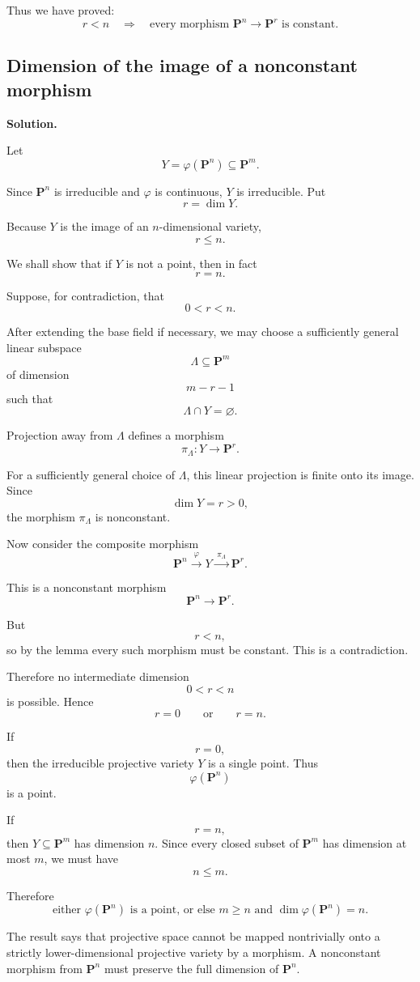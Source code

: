 Thus we have proved:
\[
\boxed{
	r<n
	\quad\Longrightarrow\quad
	\text{every morphism }\mathbf{P}^n\to \mathbf{P}^r\text{ is constant.}
}
\]

\subsection{Dimension of the image of a nonconstant morphism}

\textbf{Solution.}

Let
\[
Y=\varphi(\mathbf{P}^n)\subseteq \mathbf{P}^m.
\]

Since \(\mathbf{P}^n\) is irreducible and \(\varphi\) is continuous, \(Y\) is irreducible. Put
\[
r=\dim Y.
\]

Because \(Y\) is the image of an \(n\)-dimensional variety,
\[
r\leq n.
\]

We shall show that if \(Y\) is not a point, then in fact
\[
r=n.
\]

Suppose, for contradiction, that
\[
0<r<n.
\]

After extending the base field if necessary, we may choose a sufficiently general linear subspace
\[
\Lambda\subseteq \mathbf{P}^m
\]
of dimension
\[
m-r-1
\]
such that
\[
\Lambda\cap Y=\varnothing.
\]

Projection away from \(\Lambda\) defines a morphism
\[
\pi_{\Lambda}:Y\longrightarrow \mathbf{P}^r.
\]

For a sufficiently general choice of \(\Lambda\), this linear projection is finite onto its image. Since
\[
\dim Y=r>0,
\]
the morphism \(\pi_{\Lambda}\) is nonconstant.

Now consider the composite morphism
\[
\mathbf{P}^n
\xrightarrow{\;\varphi\;}
Y
\xrightarrow{\;\pi_{\Lambda}\;}
\mathbf{P}^r.
\]

This is a nonconstant morphism
\[
\mathbf{P}^n\longrightarrow \mathbf{P}^r.
\]

But
\[
r<n,
\]
so by the lemma every such morphism must be constant. This is a contradiction.

Therefore no intermediate dimension
\[
0<r<n
\]
is possible. Hence
\[
r=0
\qquad\text{or}\qquad
r=n.
\]

If
\[
r=0,
\]
then the irreducible projective variety \(Y\) is a single point. Thus
\[
\varphi(\mathbf{P}^n)
\]
is a point.

If
\[
r=n,
\]
then \(Y\subseteq \mathbf{P}^m\) has dimension \(n\). Since every closed subset of \(\mathbf{P}^m\) has dimension at most \(m\), we must have
\[
n\leq m.
\]

Therefore
\[
\boxed{
	\text{either }\varphi(\mathbf{P}^n)\text{ is a point, or else }
	m\geq n
	\text{ and }
	\dim\varphi(\mathbf{P}^n)=n.
}
\]

\begin{remark}
	The result says that projective space cannot be mapped nontrivially onto a strictly lower-dimensional projective variety by a morphism. A nonconstant morphism from \(\mathbf{P}^n\) must preserve the full dimension of \(\mathbf{P}^n\).
\end{remark}


